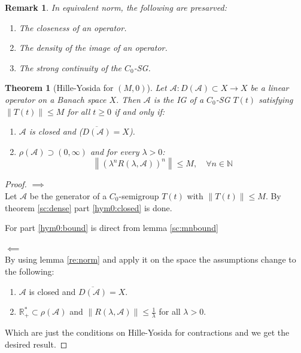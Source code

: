 \documentclass[12pt, oneside]{book}
\newtheorem{remark}{Remark}[section]
\newtheorem{theo}{Theorem}[section]
\newcommand{\norm}[1]{\left\lVert#1\right\rVert}
\newcommand{\A}{\mathscr{A}}
\begin{document}
\begin{remark}
In equivalent norm, the following are presarved:
\begin{enumerate}
	\item The closeness of an operator.
	\item The density of the image of an operator.
	\item The strong continuity of the $C_0$-SG.
\end{enumerate}
\end{remark}

\begin{theo}[Hille-Yosida for $(M, 0)$] \label{thm:HY_M0}
	Let $\A: D(\A) \subset X \to X$ be a linear operator on a Banach space $X$. Then $\A$ is the IG of a $C_0$-SG $T(t)$ satisfying $\norm{T(t)} \le M$ for all $t \ge 0$ if and only if:
\begin{enumerate}[label=(\roman*)]
	\item \label{hym0:closed} $\A$ is closed and ($\overline{D(\A)} = X$).
	\item \label{hym0:bound} $\rho(\A) \supset (0, \infty)$ and for every $\lambda > 0$:
    $$
	    \norm{(\lambda^n R(\lambda, \A))^n} \le M, \quad \forall n \in \mathbb{N}
    $$
\end{enumerate}
\end{theo}

\begin{proof}
$\implies$ \\
Let $\A$ be the generator of a $C_0$-semigroup $T(t)$ with $\norm{T(t)} \le M$. By theorem \ref{sc:dense} part \ref{hym0:closed} is done.

For part \ref{hym0:bound} is direct from lemma \ref{sc:mnbound}

\bigskip

\noindent $\impliedby$ \\
By using lemma \ref{re:norm} and apply it on the space the assumptions change to the following:
\begin{enumerate}[label=(\roman*)]
	\item $\A$ is closed and $\overline{D(\A)} = X$.
	\item $\mathbb{R}^*_+ \subset \rho(\A)$ and $\norm{R(\lambda, \A)} \le \frac{1}{\lambda}$ for all $\lambda > 0$.
\end{enumerate}
Which are just the conditions on Hille-Yosida for contractions and we get the desired result.
\end{proof}
\end{document}
